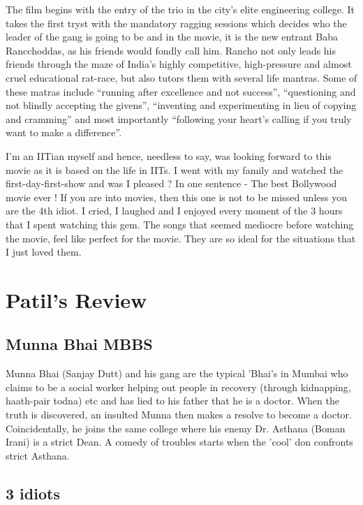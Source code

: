 \documentclass{article}
\begin{document}
The film begins with the entry of the trio in the city's elite engineering college. It takes the first tryst with the mandatory ragging sessions which decides who the leader of the gang is going to be and in the movie, it is the new entrant Baba Rancchoddas, as his friends would fondly call him. Rancho not only leads his friends through the maze of India's highly competitive, high-pressure and almost cruel educational rat-race, but also tutors them with several life mantras. Some of these matras include ``running after excellence and not success'', ``questioning and not blindly accepting the givens'', ``inventing and experimenting in lieu of copying and cramming'' and most importantly ``following your heart's calling if you truly want to make a difference''.


I'm an IITian myself and hence, needless to say, was looking forward to this movie as it is based on the life in IITs. I went with my family and watched the first-day-first-show and was I pleased ? In one sentence - The best Bollywood movie ever ! If you are into movies, then this one is not to be missed unless you are the 4th idiot. I cried, I laughed and I enjoyed every moment of the 3 hours that I spent watching this gem. The songs that seemed mediocre before watching the movie, feel like perfect for the movie. They are so ideal for the situations that I just loved them.



\section{Patil's Review}

\subsection{Munna Bhai MBBS}

 Munna Bhai (Sanjay Dutt) and his gang are the typical 'Bhai's in Mumbai who claims to be a social worker helping out people in recovery (through kidnapping, haath-pair todna) etc and has lied to his father that he is a doctor. When the truth is discovered, an insulted Munna then makes a resolve to become a doctor. Coincidentally, he joins the same college where his enemy Dr. Asthana (Boman Irani) is a strict Dean. A comedy of troubles starts when the 'cool' don confronts strict Asthana.

\subsection{3 idiots}
\end{document}
